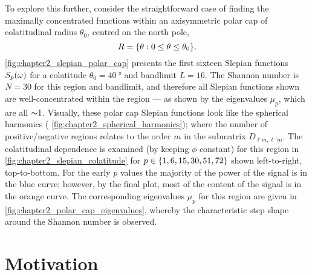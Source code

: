 To explore this further, consider the straightforward case of finding the maximally concentrated functions within an axisymmetric polar cap of colatitudinal radius \(\theta_{0}\), centred on the north pole, \ie{}
%
\begin{equation}
	R
	= \{\theta: 0 \leq \theta \leq \theta_{0}\}.
\end{equation}
%
\cref{fig:chapter2_slepian_polar_cap} presents the first sixteen Slepian functions \({S}_{p}(\omega)\) for a colatitude \(\theta_{0}=\SI{40}{\degree}\) and bandlimit \(L=16\).
The Shannon number is \(N=30\) for this region and bandlimit, and therefore all Slepian functions shown are well-concentrated within the region --- as shown by the eigenvalues \(\mu_{p}\), which are all \({\thicksim}1\).
Visually, these polar cap Slepian functions look like the spherical harmonics (\cf{} \cref{fig:chapter2_spherical_harmonics}); where the number of positive/negative regions relates to the order \(m\) in the submatrix \(D_{\ell m,\ell'm}\).
The colatitudinal dependence is examined (by keeping \(\phi{}\) constant) for this region in \cref{fig:chapter2_slepian_colatitude} for \(p \in \{1,6,15,30,51,72\}\) shown left-to-right, top-to-bottom.
For the early \(p\) values the majority of the power of the signal is in the blue curve; however, by the final plot, most of the content of the signal is in the orange curve.
The corresponding eigenvalues \(\mu_{p}\) for this region are given in \cref{fig:chapter2_polar_cap_eigenvalues}, whereby the characteristic step shape around the Shannon number is observed.







\section{Motivation}\label{sec:chapter2_motivation}

